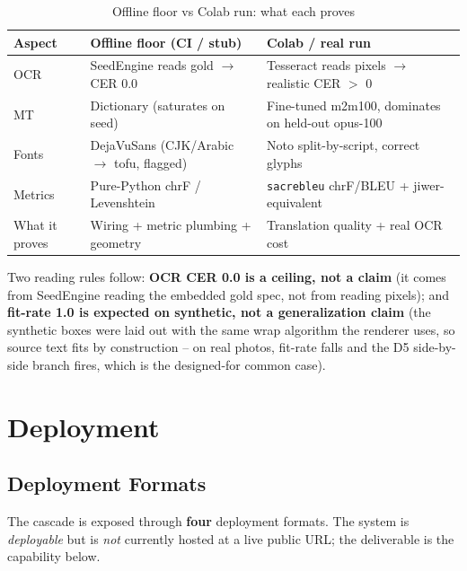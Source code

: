 \documentclass[12pt,a4paper]{article}
\begin{document}
\begin{table}[H]
\centering
\caption{Offline floor vs Colab run: what each proves}
\small
\begin{tabularx}{\linewidth}{@{} l L L @{}}
\toprule
\textbf{Aspect} & \textbf{Offline floor (CI / stub)} & \textbf{Colab / real run} \\
\midrule
OCR & SeedEngine reads gold $\rightarrow$ CER 0.0 & Tesseract reads pixels $\rightarrow$ realistic CER $>$ 0 \\
MT & Dictionary (saturates on seed) & Fine-tuned m2m100, dominates on held-out opus-100 \\
Fonts & DejaVuSans (CJK/Arabic $\rightarrow$ tofu, flagged) & Noto split-by-script, correct glyphs \\
Metrics & Pure-Python chrF / Levenshtein & \texttt{sacrebleu} chrF/BLEU + jiwer-equivalent \\
What it proves & Wiring + metric plumbing + geometry & Translation quality + real OCR cost \\
\bottomrule
\end{tabularx}
\end{table}

Two reading rules follow: \textbf{OCR CER 0.0 is a ceiling, not a claim} (it comes from SeedEngine reading the embedded gold spec, not from reading pixels); and \textbf{fit-rate 1.0 is expected on synthetic, not a generalization claim} (the synthetic boxes were laid out with the same wrap algorithm the renderer uses, so source text fits by construction -- on real photos, fit-rate falls and the D5 side-by-side branch fires, which is the designed-for common case).

\section{Deployment}
\label{sec:deployment}

\subsection{Deployment Formats}

The cascade is exposed through \textbf{four} deployment formats. The system is \emph{deployable} but is \emph{not} currently hosted at a live public URL; the deliverable is the capability below.
\end{document}

